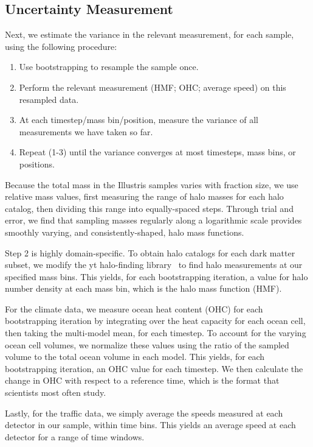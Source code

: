 \subsection{Uncertainty Measurement}
Next, we estimate the variance in the relevant measurement, for each sample, using the following procedure:

\begin{enumerate}
\item Use bootstrapping to resample the sample once.
\item Perform the relevant measurement (HMF; OHC; average speed) on this resampled data.
\item At each timestep/mass bin/position, measure the variance of all measurements we have taken so far.
\item Repeat (1-3) until the variance converges at most timesteps, mass bins, or positions.
\end{enumerate}


Because the total mass in the Illustris samples varies with fraction size, we use relative mass values, first measuring the range of halo masses for each halo catalog, then dividing this range into equally-spaced steps. Through trial and error, we find that sampling masses regularly along a logarithmic scale provides smoothly varying, and consistently-shaped, halo mass functions.

Step 2 is highly domain-specific. To obtain halo catalogs for each dark matter subset, we modify the yt halo-finding library~\cite{yt} to find halo measurements at our specified mass bins. This yields, for each bootstrapping iteration, a value for halo number density at each mass bin, which is the halo mass function (HMF). 

For the climate data, we measure ocean heat content (OHC) for each bootstrapping iteration by integrating over the heat capacity for each ocean cell, then taking the multi-model mean, for each timestep. To account for the varying ocean cell volumes, we normalize these values using the ratio of the sampled volume to the total ocean volume in each model. This yields, for each bootstrapping iteration, an OHC value for each timestep. We then calculate the change in OHC with respect to a reference time, which is the format that scientists most often study.

Lastly, for the traffic data, we simply average the speeds measured at each detector in our sample, within time bins. This yields an average speed at each detector for a range of time windows.

